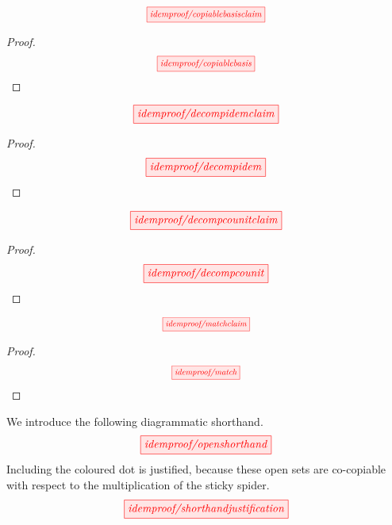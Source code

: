 \begin{myboxB}
\begin{proposition}\label{prop:copiablebasis}
\[\scalebox{0.8}{\tikzfig{idemproof/copiablebasisclaim}}\]
\begin{proof}
\[\scalebox{0.8}{\tikzfig{idemproof/copiablebasis}}\]
\end{proof}
\end{proposition}
\end{myboxB}

\begin{myboxR}
\begin{proposition}\label{prop:decompidem}
\[\scalebox{1}{\tikzfig{idemproof/decompidemclaim}}\]
\begin{proof}
\[\scalebox{1}{\tikzfig{idemproof/decompidem}}\]
\end{proof}
\end{proposition}
\end{myboxR}

\begin{myboxB}
\begin{proposition}\label{prop:decompcounit}
\[\scalebox{1}{\tikzfig{idemproof/decompcounitclaim}}\]
\begin{proof}
\[\scalebox{1}{\tikzfig{idemproof/decompcounit}}\]
\end{proof}
\end{proposition}
\end{myboxB}

\begin{myboxR}
\begin{lemma}\label{lem:match}
\[\scalebox{0.75}{\tikzfig{idemproof/matchclaim}}\]
\begin{proof}
\[\scalebox{0.75}{\tikzfig{idemproof/match}}\]
\end{proof}
\end{lemma}
\end{myboxR}

\begin{myboxB}
\begin{convention}
We introduce the following diagrammatic shorthand.
\[\scalebox{1}{\tikzfig{idemproof/openshorthand}}\]
Including the coloured dot is justified, because these open sets are co-copiable with respect to the multiplication of the sticky spider.
\[\scalebox{1}{\tikzfig{idemproof/shorthandjustification}}\]
\end{convention}
\end{myboxB}

